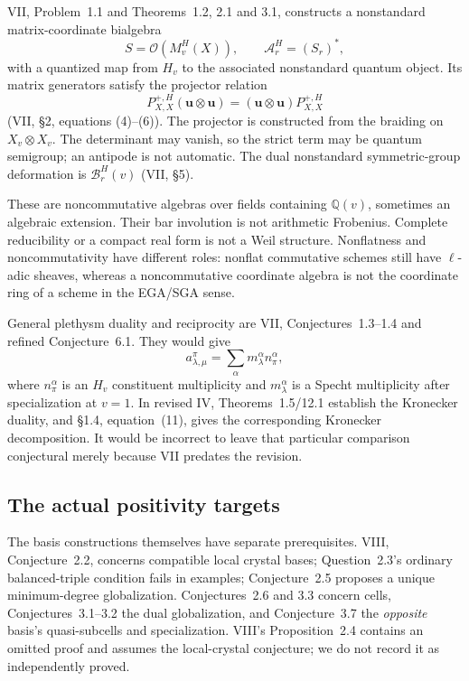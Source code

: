 \documentclass[11pt,a4paper]{article}
\newcommand{\Q}{\mathbb Q}\newcommand{\Z}{\mathbb Z}\newcommand{\C}{\mathbb C}\newcommand{\N}{\mathbb N}\newcommand{\F}{\mathbb F}
\theoremstyle{named}\newtheorem{finding}{Finding}[section]
\theoremstyle{definition}\newtheorem{definition}[finding]{Definition}
\theoremstyle{remark}\newtheorem{remark}[finding]{Remark}
\begin{document}
VII, Problem~1.1 and Theorems~1.2, 2.1 and 3.1, constructs a nonstandard matrix-coordinate bialgebra
\[
 S=\mathcal O(M_v^H(X)),\qquad \mathcal A_r^H=(S_r)^*,
\]
with a quantized map from $H_v$ to the associated nonstandard quantum object. Its matrix generators satisfy the projector relation
\[
 P^{+,H}_{X,X}(\mathbf u\otimes\mathbf u)
 =(\mathbf u\otimes\mathbf u)P^{+,H}_{X,X}
\]
(VII, \S2, equations (4)--(6)). The projector is constructed from the braiding on $X_v\otimes X_v$. The determinant may vanish, so the strict term may be quantum semigroup; an antipode is not automatic. The dual nonstandard symmetric-group deformation is $\mathcal B_r^H(v)$ (VII, \S5).

These are noncommutative algebras over fields containing $\Q(v)$, sometimes an algebraic extension. Their bar involution is not arithmetic Frobenius. Complete reducibility or a compact real form is not a Weil structure. Nonflatness and noncommutativity have different roles: nonflat commutative schemes still have \(\ell\)-adic sheaves, whereas a noncommutative coordinate algebra is not the coordinate ring of a scheme in the EGA/SGA sense.

General plethysm duality and reciprocity are VII, Conjectures~1.3--1.4 and refined Conjecture~6.1. They would give
\begin{equation}\label{eq:comparison}
a_{\lambda,\mu}^{\pi}=\sum_\alpha m_\lambda^\alpha n_\pi^\alpha,
\end{equation}
where $n_\pi^\alpha$ is an $H_v$ constituent multiplicity and $m_\lambda^\alpha$ is a Specht multiplicity after specialization at $v=1$. In revised IV, Theorems~1.5/12.1 establish the Kronecker duality, and \S1.4, equation~(11), gives the corresponding Kronecker decomposition. It would be incorrect to leave that particular comparison conjectural merely because VII predates the revision.

\subsection{The actual positivity targets}\label{sec:targets}
The basis constructions themselves have separate prerequisites. VIII, Conjecture~2.2, concerns compatible local crystal bases; Question~2.3's ordinary balanced-triple condition fails in examples; Conjecture~2.5 proposes a unique minimum-degree globalization. Conjectures~2.6 and 3.3 concern cells, Conjectures~3.1--3.2 the dual globalization, and Conjecture~3.7 the \emph{opposite} basis's quasi-subcells and specialization. VIII's Proposition~2.4 contains an omitted proof and assumes the local-crystal conjecture; we do not record it as independently proved.
\end{document}
